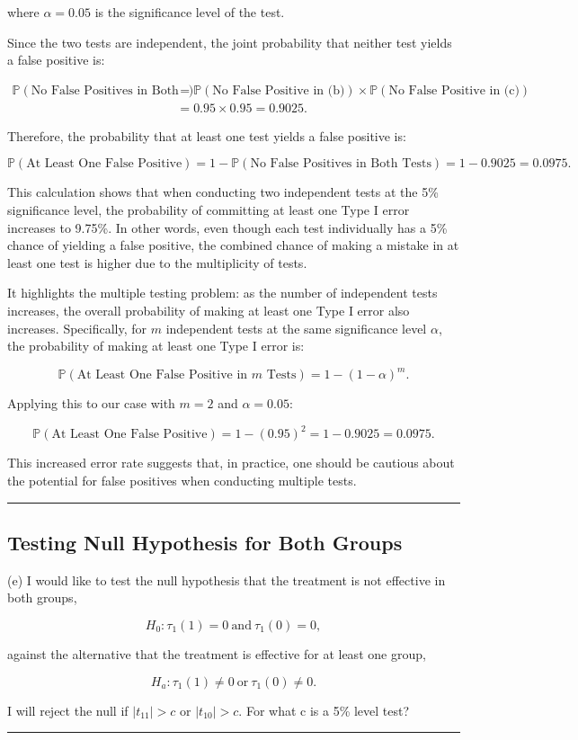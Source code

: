 \documentclass{article}
\newenvironment{colorparagraph}[1]{\par\color{#1}}{\par}
\begin{document}
where \( \alpha = 0.05 \) is the significance level of the test.

Since the two tests are independent, the joint probability that neither test yields a false positive is:

\begin{align*}
\mathbb{P}(\text{No False Positives in Both Tests}) &= \mathbb{P}(\text{No False Positive in (b)}) \times \mathbb{P}(\text{No False Positive in (c)}) \\
&= 0.95 \times 0.95 = 0.9025.
\end{align*}

Therefore, the probability that at least one test yields a false positive is:

\[
\mathbb{P}(\text{At Least One False Positive}) = 1 - \mathbb{P}(\text{No False Positives in Both Tests}) = 1 - 0.9025 = 0.0975.
\]

This calculation shows that when conducting two independent tests at the 5\% significance level, the probability of committing at least one Type I error increases to 9.75\%. In other words, even though each test individually has a 5\% chance of yielding a false positive, the combined chance of making a mistake in at least one test is higher due to the multiplicity of tests.

It highlights the multiple testing problem: as the number of independent tests increases, the overall probability of making at least one Type I error also increases. Specifically, for \( m \) independent tests at the same significance level \( \alpha \), the probability of making at least one Type I error is:

\[
\mathbb{P}(\text{At Least One False Positive in } m \text{ Tests}) = 1 - (1 - \alpha)^m.
\]

Applying this to our case with \( m = 2 \) and \( \alpha = 0.05 \):

\[
\mathbb{P}(\text{At Least One False Positive}) = 1 - (0.95)^2 = 1 - 0.9025 = 0.0975.
\]

This increased error rate suggests that, in practice, one should be cautious about the potential for false positives when conducting multiple tests.

\begin{colorparagraph}{questioncolor}
\rule{\textwidth}{0.5pt}

\label{q1e}\subsection{Testing Null Hypothesis for Both Groups}
(e) I would like to test the null hypothesis that the treatment is not effective in both groups,

\[
H_0 : \tau_1(1) = 0 \ \text{and} \ \tau_1(0) = 0,
\]

against the alternative that the treatment is effective for at least one group,

\[
H_a : \tau_1(1) \neq 0 \ \text{or} \ \tau_1(0) \neq 0.
\]

I will reject the null if \( |t_{11}| > c \) or \( |t_{10}| > c \). For what c is a 5\% level test?

\rule{\textwidth}{0.5pt}
\end{colorparagraph}
\end{document}
